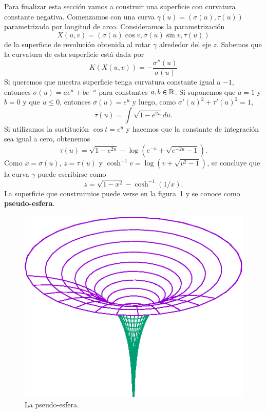 
Para finalizar esta sección vamos a construir una superficie con curvatura
constante negativa. Comenzamos con una curva $\gamma(u)=(\sigma(u),\tau(u))$
parametrizada por longitud de arco. Consideramos la parametrización
\[
	X(u,v)=(\sigma(u)\cos v,\sigma(u)\sin v,\tau(u))
\]
de la superficie de revolución obtenida al rotar $\gamma$ alrededor del eje $z$. Sabemos
que la curvatura de esta superficie está dada por
\[
	K(X(u,v))=-\frac{\sigma''(u)}{\sigma(u)}
\]
Si queremos que nuestra superficie tenga curvatura constante igual a $-1$, entonces
$\sigma(u)=ae^u+be^{-u}$ para constantes $a,b\in\mathbb{R}$. Si suponemos que $a=1$ y $b=0$ y que $u\leq0$, entonces $\sigma(u)=e^u$ y luego,  
como $\sigma'(u)^2+\tau'(u)^2=1$, 
\[
	\tau(u)=\int\sqrt{1-e^{2u}}du.
\]
Si utilizamos la sustitución $\cos t=e^{u}$ y hacemos que la constante de integración sea igual a cero, obtenemos
\[
	\tau(u)=\sqrt{1-e^{2u}}-\log\left(e^{-u}+\sqrt{e^{-2u}-1}\right).
\]
Como $x=\sigma(u)$, $z=\tau(u)$ y $\cosh^{-1}v=\log(v+\sqrt{v^2-1})$, se concluye que
la curva $\gamma$ puede escribirse como
\[
	z=\sqrt{1-x^2}-\cosh^{-1}(1/x).
\]
La superficie que construimios puede verse en la figura~\ref{fig:pseudo} y se
conoce como \textbf{pseudo-esfera}.  

\begin{figure}
		\centering
    	\includegraphics[scale=0.30]{eps/pseudo}
		\caption{La pseudo-esfera.}
		\label{fig:pseudo}
\end{figure}

